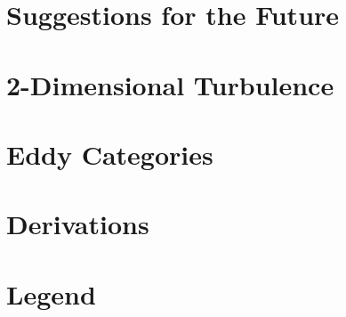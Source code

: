 
\appendix
\begin{appendices}
\begin{small}

\chapter{Suggestions for the Future}

\chapter{2-Dimensional Turbulence}

\chapter{Eddy Categories}

\chapter{Derivations}


\chapter{Legend}



\end{small}
\end{appendices}
\FloatBarrier



